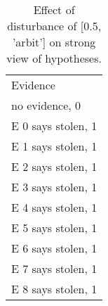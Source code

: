 \begin{table}\begin{tabular}{l}\toprule\multirow{2}{*}{Evidence} \\\\\midrule
no evidence, 0 & \\E 0 says stolen, 1 & \\E 1 says stolen, 1 & \\E 2 says stolen, 1 & \\E 3 says stolen, 1 & \\E 4 says stolen, 1 & \\E 5 says stolen, 1 & \\E 6 says stolen, 1 & \\E 7 says stolen, 1 & \\E 8 says stolen, 1 & \\\bottomrule\end{tabular}\caption{Effect of disturbance of [0.5, 'arbit'] on strong view of hypotheses.}\end{table}